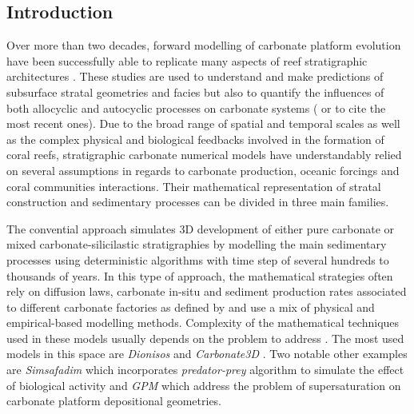 \documentclass[default,jgrga]{agutex2015}
\begin{document}
\begin{article}

%
%

\section{Introduction}

Over more than two decades, forward modelling of carbonate platform evolution have been successfully able to replicate many aspects of reef stratigraphic architectures \citep{Bosence90, Parcell03, Hasler08, Barrett12, Seard13, Huang15, Kolodka16}. These studies are used to understand and make predictions of subsurface stratal geometries and facies but also to quantify the influences of both allocyclic and autocyclic processes on carbonate systems (\citet{Williams11} or \citet{Burgess13} to cite the most recent ones). Due to the broad range of spatial and temporal scales as well as the complex physical and biological feedbacks involved in the formation of coral reefs, stratigraphic carbonate numerical models have understandably relied on several assumptions in regards to carbonate production, oceanic forcings and coral communities interactions. Their mathematical representation of stratal construction and sedimentary processes can be divided in three main families.

\noindent The convential approach simulates 3D development of either pure carbonate or mixed carbonate-silicilastic stratigraphies by modelling the main sedimentary processes using deterministic algorithms with time step of several hundreds to thousands of years. In this type of approach, the mathematical strategies often rely on diffusion laws, carbonate in-situ and sediment production rates associated to different carbonate factories as defined by \citet{James92} and use a mix of physical and empirical-based modelling methods. Complexity of the mathematical techniques used in these models usually depends on the problem to address \citep{Granjeon99, Warrlich02, Toomey16}. The most used models in this space are \textit{Dionisos} \citep{Granjeon99} and \textit{Carbonate3D} \citep{Warrlich02}. Two notable other examples are \textit{Simsafadim} \citep{Bitzer01} which incorporates \textit{predator-prey} algorithm to simulate the effect of biological activity and \textit{GPM} \citep{Tetzlaff05, Hill06} which address the problem of supersaturation on carbonate platform depositional geometries.


\end{article}
\end{document}
